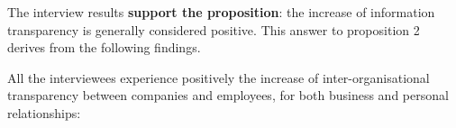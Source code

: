 The interview results {\bf support the proposition}: the increase of information transparency is generally considered positive. This answer to proposition 2 derives from the following findings.

%
%
%
%
%
%
%
%


 All the interviewees experience positively the increase of inter-organisational transparency between companies and employees, for both business and personal relationships: 

